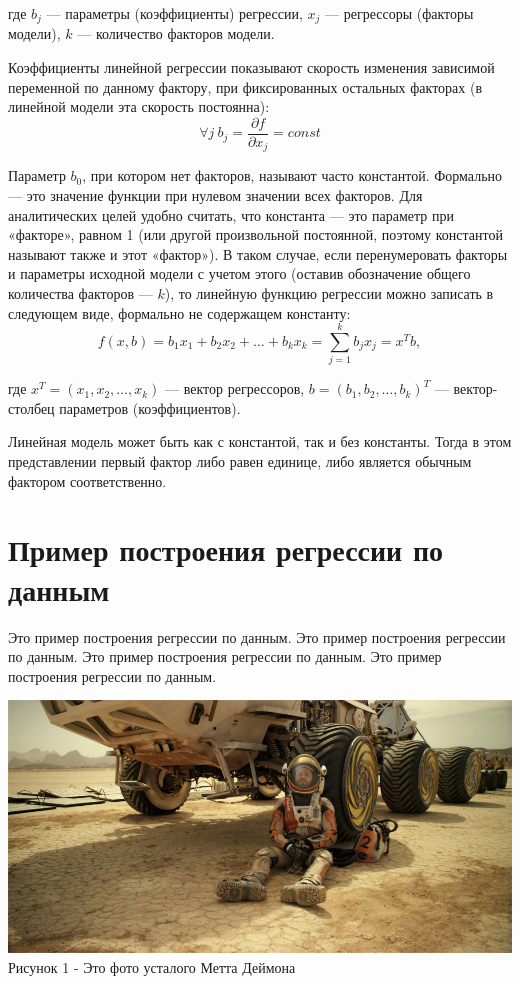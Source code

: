 \documentclass[oneside,a4paper,final,14pt]{article}
\begin{document}
где $b_j$ — параметры (коэффициенты) регрессии, $x_j$ — регрессоры (факторы модели), $k$ — количество факторов модели.

Коэффициенты линейной регрессии показывают скорость изменения зависимой переменной по данному фактору, при фиксированных остальных факторах (в линейной модели эта скорость постоянна):
\begin{equation}
\forall j ~b_j=\frac {\partial f}{\partial x_j}=const
\end{equation}

Параметр $b_0$, при котором нет факторов, называют часто константой. Формально — это значение функции при нулевом значении всех факторов. Для аналитических целей удобно считать, что константа — это параметр при «факторе», равном 1 (или другой произвольной постоянной, поэтому константой называют также и этот «фактор»). В таком случае, если перенумеровать факторы и параметры исходной модели с учетом этого (оставив обозначение общего количества факторов — $k$), то линейную функцию регрессии можно записать в следующем виде, формально не содержащем константу:
$$f(x,b)=b_1 x_1 + b_2 x_2 + \ldots + b_k x_k=\sum^k_{j=1}b_j x_j=x^Tb,$$

где $x^T=(x_1,x_2,\ldots,x_k)$ — вектор регрессоров, $b=(b_1,b_2, \ldots,b_k)^T$ — вектор-столбец параметров (коэффициентов).

Линейная модель может быть как с константой, так и без константы. Тогда в этом представлении первый фактор либо равен единице, либо является обычным фактором соответственно.

\newpage

\section{Пример построения регрессии по данным}
\vspace{12pt}

Это пример построения регрессии по данным. Это пример построения регрессии по данным. Это пример построения регрессии по данным. Это пример построения регрессии по данным.

\begin{center}
  \includegraphics[scale=1.0]{images/rest.jpg}\\
  Рисунок 1 - Это фото усталого Метта Деймона 
\end{center}
\end{document}
